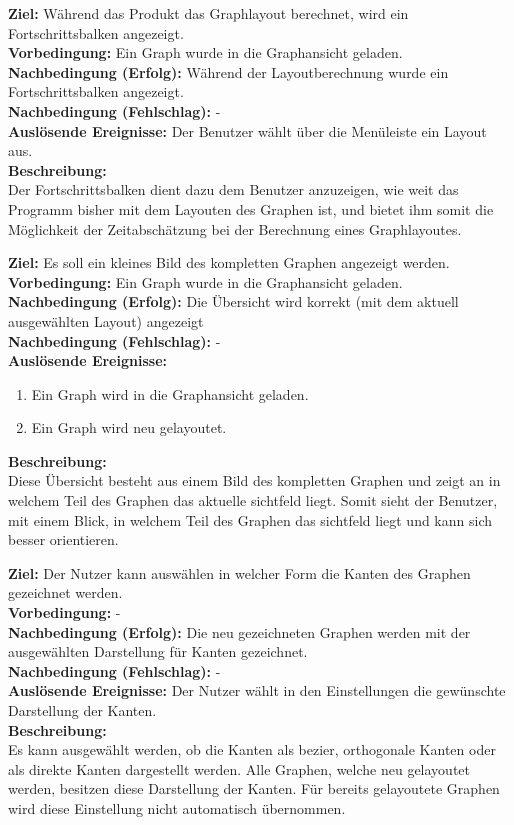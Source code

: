 \label{fa:fortschritt}
\textbf{Ziel:} Während das Produkt das Graphlayout berechnet, wird ein Fortschrittsbalken angezeigt.\\
\textbf{Vorbedingung:} Ein Graph wurde in die Graphansicht geladen.\\
\textbf{Nachbedingung (Erfolg):} Während der Layoutberechnung wurde ein Fortschrittsbalken angezeigt.\\
\textbf{Nachbedingung (Fehlschlag):} -\\
\textbf{Auslösende Ereignisse:} Der Benutzer wählt über die Menüleiste ein Layout aus.\\
\textbf{Beschreibung:}\\
Der Fortschrittsbalken dient dazu dem Benutzer anzuzeigen, wie weit das Programm bisher mit dem Layouten des Graphen ist, und bietet ihm somit die Möglichkeit der Zeitabschätzung bei der Berechnung eines Graphlayoutes.

\label{fa:uebersicht}
\textbf{Ziel:} Es soll ein kleines Bild des kompletten Graphen angezeigt werden.\\
\textbf{Vorbedingung:} Ein Graph wurde in die Graphansicht geladen.\\
\textbf{Nachbedingung (Erfolg):} Die Übersicht wird korrekt (mit dem aktuell ausgewählten Layout) angezeigt\\
\textbf{Nachbedingung (Fehlschlag):} -\\
\textbf{Auslösende Ereignisse:}
\begin{enumerate}[nolistsep, label=(\alph*)]
  \item Ein Graph wird in die Graphansicht geladen.
  \item Ein Graph wird neu gelayoutet.
\end{enumerate}
\textbf{Beschreibung:}\\
Diese Übersicht besteht aus einem Bild des kompletten Graphen und zeigt an in welchem Teil des Graphen das aktuelle \gls{sichtfeld} liegt. Somit sieht der Benutzer, mit einem Blick, in welchem Teil des Graphen das \gls{sichtfeld} liegt und kann sich besser orientieren.

\label{fa:darst-kanten}
\textbf{Ziel:} Der Nutzer kann auswählen in welcher Form die Kanten des Graphen gezeichnet werden.\\
\textbf{Vorbedingung:} -\\
\textbf{Nachbedingung (Erfolg):} Die neu gezeichneten Graphen werden mit der ausgewählten Darstellung für Kanten gezeichnet. \\
\textbf{Nachbedingung (Fehlschlag):} -\\
\textbf{Auslösende Ereignisse:} Der Nutzer wählt in den Einstellungen die gewünschte Darstellung der Kanten.\\
\textbf{Beschreibung:}\\
Es kann ausgewählt werden, ob die Kanten als \gls{bezier}, orthogonale Kanten oder als direkte Kanten dargestellt werden. Alle Graphen, welche neu gelayoutet werden, besitzen diese Darstellung der Kanten. Für bereits gelayoutete Graphen wird diese Einstellung nicht automatisch übernommen.

